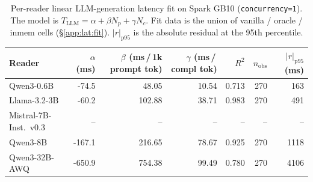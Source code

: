 \begin{table}[!htbp]
\centering
\small
\caption{Per-reader linear LLM-generation latency fit on Spark GB10 (\texttt{concurrency=1}). The model is $T_{\text{LLM}} = \alpha + \beta N_p + \gamma N_c$. Fit data is the union of vanilla / oracle / inmem cells (\S\ref{app:lat:fit}). $|r|_{\text{p95}}$ is the absolute residual at the 95th percentile.}
\label{tab:appendix-latency-fit}
\begin{tabular}{lrrrrrr}
\toprule
Reader & $\alpha$ (ms) & $\beta$ (ms\,/\,1k prompt tok) & $\gamma$ (ms\,/\,compl tok) & $R^2$ & $n_{\text{obs}}$ & $|r|_{\text{p95}}$ (ms) \\
\midrule
Qwen3-0.6B & -74.5 & 48.05 & 10.54 & 0.713 & 270 & 163 \\
Llama-3.2-3B & -60.2 & 102.88 & 38.71 & 0.983 & 270 & 491 \\
Mistral-7B-Inst.\ v0.3 & -- & -- & -- & -- & -- & -- \\
Qwen3-8B & -167.1 & 216.65 & 78.67 & 0.925 & 270 & 1118 \\
Qwen3-32B-AWQ & -650.9 & 754.38 & 99.49 & 0.780 & 270 & 4106 \\
\bottomrule
\end{tabular}
\end{table}
